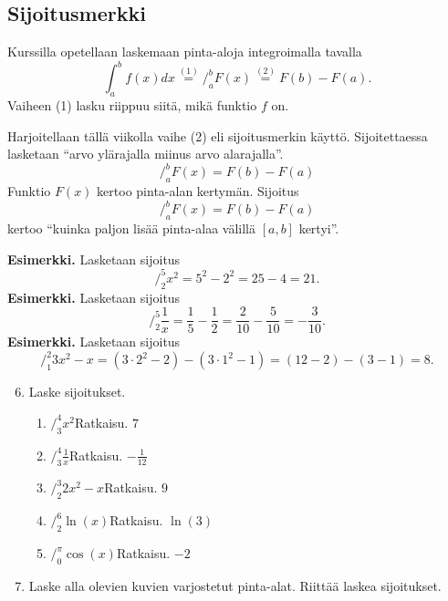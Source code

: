 \documentclass[10pt]{article}
\newcommand{\ratkaisu}[1]{\hfill{\color{blue}\quad\textrm{Ratkaisu. } #1}}
\newcommand{\sij}[0]{\bigg/}
\begin{document}
\def\px{1}
\def\py{3}
\def\qx{3}
\def\qy{2}

\newpage

\subsection{Sijoitusmerkki}

Kurssilla opetellaan laskemaan pinta-aloja integroimalla tavalla
$$
\int_a^b f(x)dx\stackrel{(1)}{=}\sij_a^b F(x)\stackrel{(2)}{=}F(b)-F(a).
$$
Vaiheen (1) lasku riippuu siitä, mikä funktio $f$ on.

Harjoitellaan tällä viikolla vaihe (2) eli sijoitusmerkin käyttö. Sijoitettaessa lasketaan ``arvo ylärajalla miinus arvo alarajalla''.
$$
\sij_a^b F(x)=F(b)-F(a)
$$
Funktio $F(x)$ kertoo pinta-alan kertymän. Sijoitus
$$
\sij_a^b F(x)=F(b)-F(a)
$$
kertoo ``kuinka paljon lisää pinta-alaa välillä $[a,b]$ kertyi''.

\textbf{Esimerkki.} Lasketaan sijoitus
$$
\sij_2^5 x^2=5^2-2^2=25-4=21.
$$
\textbf{Esimerkki.} Lasketaan sijoitus
$$
\sij_2^5 \frac{1}{x}=\frac{1}{5}-\frac{1}{2}=\frac{2}{10}-\frac{5}{10}=-\frac{3}{10}.
$$
\textbf{Esimerkki.} Lasketaan sijoitus
$$
\sij_1^2 3x^2-x=(3\cdot 2^2-2)-(3\cdot 1^2-1)=(12-2)-(3-1)=8.
$$

\begin{enumerate}
\setcounter{enumi}{5}
\item Laske sijoitukset.
\begin{enumerate}
\item $\sij_3^4 x^2$\ratkaisu{$7$}
\item $\sij_3^4 \frac{1}{x}$\ratkaisu{$-\frac{1}{12}$}
\item $\sij_2^3 2x^2-x$\ratkaisu{$9$}
\item $\sij_2^6 \ln(x)$\ratkaisu{$\ln(3)$}
\item $\sij_0^\pi\cos(x)$\ratkaisu{$-2$}
\end{enumerate}\newpage
\item Laske alla olevien kuvien varjostetut pinta-alat. Riittää laskea sijoitukset. 
\end{enumerate}
\end{document}
